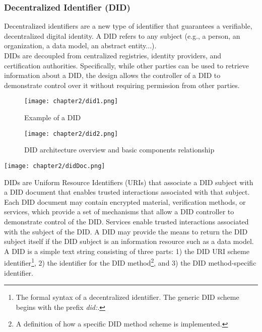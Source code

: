 \subsubsection{Decentralized Identifier (DID)}
Decentralized identifiers\cite{site:w3cdids} are a new type of identifier that guarantees a verifiable, 
decentralized digital identity. A DID refers to any subject (e.g., a person, an 
organization, a data model, an abstract entity...).\\
DIDs are decoupled from centralized registries, identity providers, and certification 
authorities. Specifically, while other parties can be used to retrieve information 
about a DID, the design allows the controller of a DID to demonstrate control over it 
without requiring permission from other parties.
\begin{figure}[!htb]
    \begin{minipage}{0.48\textwidth}
      \centering
      \texttt{[image: chapter2/did1.png]}
      \vspace{1.1cm}
      \caption{Example of a DID}
    \end{minipage}\hfill
    \begin{minipage}{0.48\textwidth}
      \centering
      \texttt{[image: chapter2/did2.png]}
      \caption{DID architecture overview and basic components relationship}
    \end{minipage}
 \end{figure}
\begin{center}
    \vspace{-0.8cm}
    \texttt{[image: chapter2/didDoc.png]}
    \vspace{-0.4cm}
\end{center}
\vspace{0.5cm}
DIDs are Uniform Resource Identifiers (URIs) that associate a DID subject with a DID 
document that enables trusted interactions associated with that subject.
Each DID document may contain encrypted material, verification methods, or services, 
which provide a set of mechanisms that allow a DID controller to demonstrate control 
of the DID. Services enable trusted interactions associated with the subject of the 
DID. A DID may provide the means to return the DID subject itself if the DID subject 
is an information resource such as a data model.\\
A DID is a simple text string consisting of three parts: 1) the DID URI scheme 
identifier\footnote{The formal syntax of a decentralized identifier. The generic 
DID scheme begins with the prefix \textit{did:}.}, 2) the identifier for the DID 
method\footnote{A definition of how a specific DID method scheme is implemented.}, and 3) 
the DID method-specific identifier.

